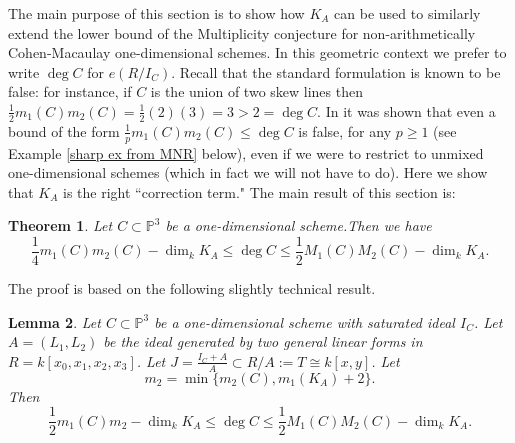 \documentclass[12pt,twoside]{amsart}
\numberwithin{equation}{section}
\newtheorem{theorem}{Theorem}[section]
\newtheorem{lemma}[theorem]{Lemma}
\theoremstyle{definition}
\begin{document}
The main purpose of this section is to show how $K_A$ can be used to similarly extend the
lower bound of the Multiplicity conjecture for non-arithmetically Cohen-Macaulay
one-dimensional schemes.  In this geometric context we prefer to write $\deg C$ for
$e(R/I_C)$.  Recall that the standard formulation is known to be false: for instance, if
$C$ is the union of two skew lines then $\frac{1}{2} m_1(C) m_2(C) = \frac{1}{2}(2)(3) =
3 > 2 = \deg C$.  In \cite{MNR} it was shown that even a bound of the form $\frac{1}{p}
m_1(C) m_2(C) \leq \deg C$ is false, for any $p \geq 1$ (see Example \ref{sharp ex from
MNR} below), even if we were to restrict to unmixed one-dimensional schemes (which in
fact we will not have to do).  Here we show that $K_A$ is the right ``correction term."
The main result of this section is:

\begin{theorem} \label{thm-bounds-curve}
Let $C \subset {\mathbb P}^3$ be a one-dimensional scheme.Then  we have
\[
\frac{1}{4} m_1(C) m_2(C) - \dim_k K_A \leq \deg C \leq \frac{1}{2} M_1(C) M_2(C) -
\dim_k K_A.
\]
\end{theorem}

The proof is based on the following slightly technical result.

\begin{lemma} \label{lowerbd-curves}
Let $C \subset {\mathbb P}^3$ be a one-dimensional scheme with saturated ideal
$I_C$.  Let
$A = (L_1, L_2)$ be the ideal generated by two general linear forms in $R =
k[x_0,x_1,x_2,x_3]$.  Let $J = \frac{I_C + A}{A} \subset R/A := T  \cong
k[x,y]$. Let
\[
m_2 = \min \{ m_2(C), m_1(K_A) +2 \}.
\]
Then
\[
\frac{1}{2} m_1(C) m_2 - \dim_k K_A \leq \deg C \leq \frac{1}{2} M_1(C)M_2(C) - \dim_k
K_A.
\]
\end{lemma}
\end{document}
